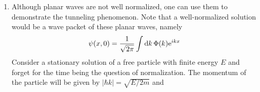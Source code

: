 \documentclass[../psets.tex]{subfiles}
\begin{document}
\begin{enumerate}
\begin{enumerate}
\begin{proof}
            \begin{equation*}
                \boxed{\psi_2(x) = 0}
            \end{equation*}
            Additionally, the boundary conditions at zero (and the fact that $A=0$) imply that
            \begin{align*}
                \psi_1(0) &= \psi_2(0)&
                    \psi_1'(0) &= \psi_2'(0)\\
                C_1 &= B&
                    k_1S_1 &= -\kappa_2B
            \end{align*}
            Therefore, our last boundary condition gives us that
            \begin{align*}
                0 &= \psi_1\left( -\frac{a}{2} \right)\\
                &= S_1\sin(-\frac{k_1a}{2})+C_1\cos(-\frac{k_1a}{2})\\
                &= -S_1\sin(\frac{k_1a}{2})+C_1\cos(\frac{k_1a}{2})\\
                &= \frac{\kappa_2B}{k_1}\sin(\frac{k_1a}{2})+B\cos(\frac{k_1a}{2})\\
                &= \sin(\frac{k_1a}{2})+\frac{k_1}{\kappa_2}\cos(\frac{k_1a}{2})\\
                &= \sin(\frac{k_1a}{2})+\frac{k_1}{\infty}\cos(\frac{k_1a}{2})\\
                &= \sin(\frac{k_1a}{2})\\
                \frac{k_1a}{2} &= \pi n\\
                \frac{\sqrt{2mE_n}}{\hbar} &= \frac{2\pi n}{a}\\
                E_n &= \frac{\hbar^2\pi^2n^2}{2m(a/2)^2}
            \end{align*}
            as desired. So 
        \end{proof}
    \end{enumerate}
    \item Although planar waves are not well normalized, one can use them to demonstrate the tunneling phenomenon. Note that a well-normalized solution would be a wave packet of these planar waves, namely
    \begin{equation}
        \psi(x,0) = \frac{1}{\sqrt{2\pi}}\int\dd{k}\Phi(k)\e[ikx]
    \end{equation}
    Consider a stationary solution of a free particle with finite energy $E$ and forget for the time being the question of normalization. The momentum of the particle will be given by $|\hbar k|=\sqrt{E/2m}$ and

\end{enumerate}
\end{document}

